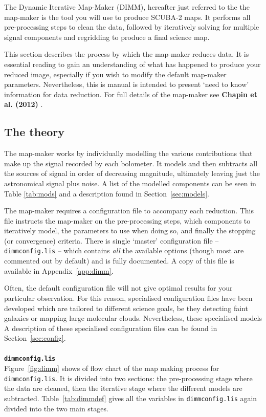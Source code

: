 \documentclass[twoside,11pt]{article}
\newcommand{\xlabel}[1]{}
\renewcommand{\_}{\texttt{\symbol{95}}}
\begin{document}
The Dynamic Iterative Map-Maker (DIMM), hereafter just referred to the
the map-maker is the tool you will use to produce SCUBA-2 maps. It
performs all pre-processing steps to clean the data, followed by
iteratively solving for multiple signal components and regridding to
produce a final science map.

This section describes the process by which the map-maker reduces
data. It is essential reading to gain an understanding of what has
happened to produce your reduced image, especially if you wish to
modify the default map-maker parameters. Nevertheless, this is manual
is intended to present `need to know' information for data reduction.
For full details of the map-maker see \textbf{Chapin et al. (2012)} \cite{mapmaker}.

\subsection{\xlabel{dimm_theory}The theory}

The map-maker works by individually modelling the various
contributions that make up the signal recorded by each bolometer. It
models and then subtracts all the sources of signal in order of
decreasing magnitude, ultimately leaving just the astronomical signal
plus noise. A list of the modelled components can be seen in Table
\ref{tab:mods} and a description found in Section~\ref{sec:models}.

The map-maker requires a configuration file to accompany each
reduction. This file instructs the map-maker on the pre-processing
steps, which components to iteratively model, the parameters to use
when doing so, and finally the stopping (or convergence) criteria.
There is single `master' configuration file -- \texttt{dimmconfig.lis}
-- which contains \emph{all} the available options (though most are
commented out by default) and is fully documented. A copy of this file
is available in Appendix~\ref{app:dimm}.

Often, the default configuration file will not give optimal results
for your particular observation. For this reason, specialised
configuration files have been developed which are tailored to
different science goals, be they detecting faint galaxies or mapping
large molecular clouds. Nevertheless, these specialised models A
description of these specialised configuration files can be found in
Section~\ref{sec:config}.
\\ \\
{\large{\texttt{\bf dimmconfig.lis}}}\\
Figure~\ref{fig:dimm} shows of flow chart of the map making process
for \texttt{dimmconfig.lis}. It is divided into two sections: the
pre-processing stage where the data are cleaned, then the iterative
stage where the different models are subtracted.
Table~\ref{tab:dimmdef} gives all the variables in
\texttt{dimmconfig.lis} again divided into the two main stages.
\end{document}
